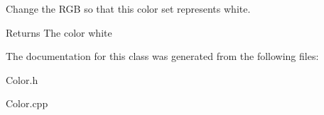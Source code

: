 Change the R\-G\-B so that this color set represents white. \begin{DoxyReturn}{Returns}
The color white 
\end{DoxyReturn}


The documentation for this class was generated from the following files\-:\begin{DoxyCompactItemize}
\item 
Color.\-h\item 
Color.\-cpp\end{DoxyCompactItemize}
